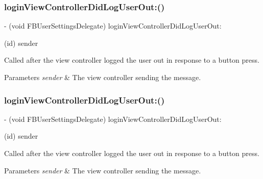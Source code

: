 \subsubsection{\texorpdfstring{login\+View\+Controller\+Did\+Log\+User\+Out\+:()}{loginViewControllerDidLogUserOut:()}\hspace{0.1cm}{\footnotesize\ttfamily [1/5]}}
{\footnotesize\ttfamily -\/ (void F\+B\+User\+Settings\+Delegate) login\+View\+Controller\+Did\+Log\+User\+Out\+: \begin{DoxyParamCaption}\item[{(id)}]{sender }\end{DoxyParamCaption}\hspace{0.3cm}{\ttfamily [optional]}}

Called after the view controller logged the user out in response to a button press.


\begin{DoxyParams}{Parameters}
{\em sender} & The view controller sending the message. \\
\hline
\end{DoxyParams}
\mbox{\label{protocolFBUserSettingsDelegate_01-p_a6e8b97e1802353fbbc0c5058189a3f79}} 
\subsubsection{\texorpdfstring{login\+View\+Controller\+Did\+Log\+User\+Out\+:()}{loginViewControllerDidLogUserOut:()}\hspace{0.1cm}{\footnotesize\ttfamily [2/5]}}
{\footnotesize\ttfamily -\/ (void F\+B\+User\+Settings\+Delegate) login\+View\+Controller\+Did\+Log\+User\+Out\+: \begin{DoxyParamCaption}\item[{(id)}]{sender }\end{DoxyParamCaption}\hspace{0.3cm}{\ttfamily [optional]}}

Called after the view controller logged the user out in response to a button press.


\begin{DoxyParams}{Parameters}
{\em sender} & The view controller sending the message. \\
\hline
\end{DoxyParams}
\mbox{\label{protocolFBUserSettingsDelegate_01-p_a6e8b97e1802353fbbc0c5058189a3f79}} 
